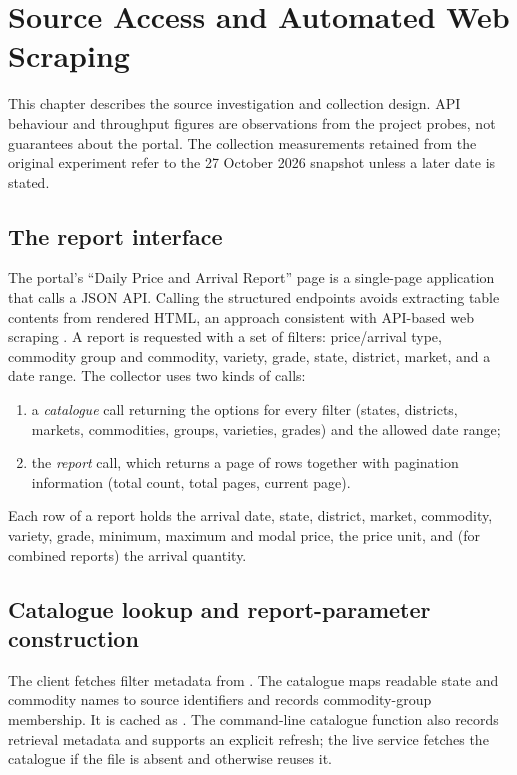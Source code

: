 \documentclass[12pt,a4paper,oneside]{report}
\numberwithin{equation}{chapter}
\numberwithin{figure}{chapter}
\numberwithin{table}{chapter}
\theoremstyle{definition}
\begin{document}
\chapter{Source Access and Automated Web Scraping}

This chapter describes the source investigation and collection design. API behaviour and throughput figures are observations from the project probes, not guarantees about the portal. The collection measurements retained from the original experiment refer to the 27 October 2026 snapshot unless a later date is stated.

\section{The report interface}
The portal's ``Daily Price and Arrival Report'' page is a single-page application that calls a JSON API. Calling the structured endpoints avoids extracting table contents from rendered HTML, an approach consistent with API-based web scraping \cite{glez2014}. A report is requested with a set of filters: price/arrival type, commodity group and commodity, variety, grade, state, district, market, and a date range. The collector uses two kinds of calls:
\begin{enumerate}
  \item a \emph{catalogue} call returning the options for every filter (states, districts, markets, commodities, groups, varieties, grades) and the allowed date range;
  \item the \emph{report} call, which returns a page of rows together with pagination information (total count, total pages, current page).
\end{enumerate}
Each row of a report holds the arrival date, state, district, market, commodity, variety, grade, minimum, maximum and modal price, the price unit, and (for combined reports) the arrival quantity.

\section{Catalogue lookup and report-parameter construction}
The client fetches filter metadata from . The catalogue maps readable state and commodity names to source identifiers and records commodity-group membership. It is cached as . The command-line catalogue function also records retrieval metadata and supports an explicit refresh; the live service fetches the catalogue if the file is absent and otherwise reuses it.
\end{document}
